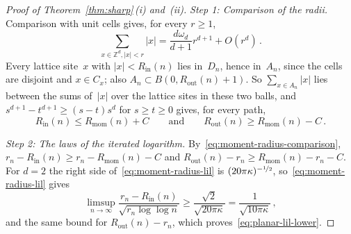 \documentclass[11pt]{amsart}
\theoremstyle{plain}
\theoremstyle{definition}
\newcommand{\Z}{\mathbb Z}
\newcommand{\drift}{\kappa}
\newcommand{\nf}{\nicefrac}
\newcommand{\Rin}{R_{\mathrm{in}}}
\newcommand{\Rout}{R_{\mathrm{out}}}
\newcommand{\Rmom}{R_{\mathrm{mom}}}
\numberwithin{equation}{section}
\begin{document}
\begin{proof}[Proof of Theorem~\ref{thm:sharp}\,\textup{(i)} and~\textup{(ii)}]
\emph{Step 1: Comparison of the radii.} Comparison with unit cells gives, for every $r\geq1$,
\begin{equation*}
\sum_{x\in\Z^d,|x|<r}|x|=\frac{d\omega_d}{d+1}r^{d+1}+O(r^d)\, .
\end{equation*}
Every lattice site~$x$ with $|x|<\Rin(n)$ lies in~$D_n$, hence in~$A_n$, since the cells are disjoint and $x\in C_x$; also $A_n\subset B(0,\Rout(n)+1)$. So $\sum_{x\in A_n}|x|$ lies between the sums of~$|x|$ over the lattice sites in these two balls, and $s^{d+1}-t^{d+1}\geq(s-t)s^d$ for $s\geq t\geq0$ gives, for every path,
\begin{equation}\label{eq:moment-radius-comparison}
\Rin(n)\leq\Rmom(n)+C
\qquad\text{and}\qquad
\Rout(n)\geq\Rmom(n)-C\, .
\end{equation}

\emph{Step 2: The laws of the iterated logarithm.} By~\eqref{eq:moment-radius-comparison}, $r_n-\Rin(n)\geq r_n-\Rmom(n)-C$ and $\Rout(n)-r_n\geq\Rmom(n)-r_n-C$. For $d=2$ the right side of~\eqref{eq:moment-radius-lil} is $(20\pi\drift)^{-\nf12}$, so~\eqref{eq:moment-radius-lil} gives
\begin{equation*}
\limsup_{n\to\infty}\frac{r_n-\Rin(n)}{\sqrt{r_n\log\log n}}\geq\frac{\sqrt2}{\sqrt{20\pi\drift}}=\frac1{\sqrt{10\pi\drift}}\, ,
\end{equation*}
and the same bound for $\Rout(n)-r_n$, which proves~\eqref{eq:planar-lil-lower}.


\end{proof}
\end{document}
